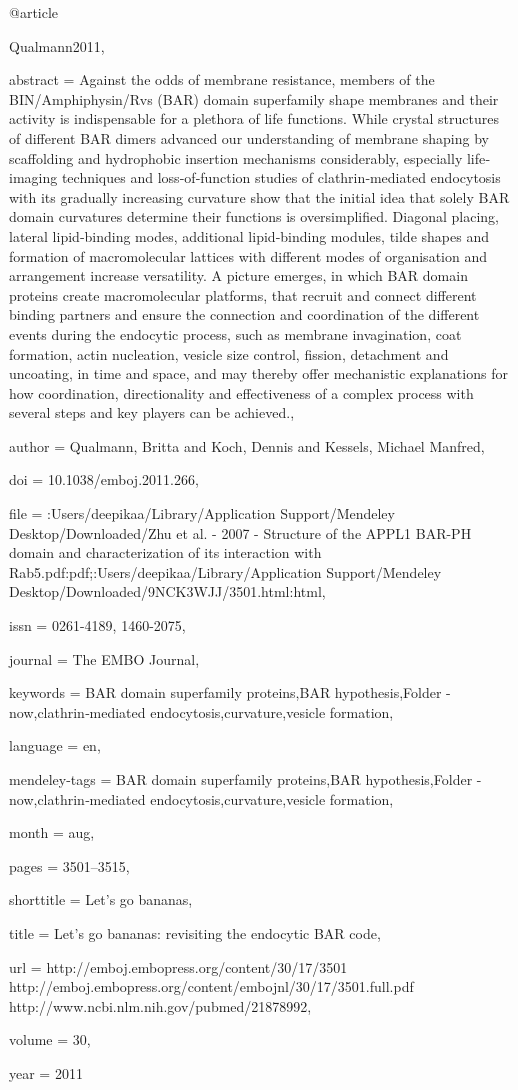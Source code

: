 @article{Qualmann2011,

abstract = {Against the odds of membrane resistance, members of the BIN/Amphiphysin/Rvs (BAR) domain superfamily shape membranes and their activity is indispensable for a plethora of life functions. While crystal structures of different BAR dimers advanced our understanding of membrane shaping by scaffolding and hydrophobic insertion mechanisms considerably, especially life‐imaging techniques and loss‐of‐function studies of clathrin‐mediated endocytosis with its gradually increasing curvature show that the initial idea that solely BAR domain curvatures determine their functions is oversimplified. Diagonal placing, lateral lipid‐binding modes, additional lipid‐binding modules, tilde shapes and formation of macromolecular lattices with different modes of organisation and arrangement increase versatility. A picture emerges, in which BAR domain proteins create macromolecular platforms, that recruit and connect different binding partners and ensure the connection and coordination of the different events during the endocytic process, such as membrane invagination, coat formation, actin nucleation, vesicle size control, fission, detachment and uncoating, in time and space, and may thereby offer mechanistic explanations for how coordination, directionality and effectiveness of a complex process with several steps and key players can be achieved.},

author = {Qualmann, Britta and Koch, Dennis and Kessels, Michael Manfred},

doi = {10.1038/emboj.2011.266},

file = {:Users/deepikaa/Library/Application Support/Mendeley Desktop/Downloaded/Zhu et al. - 2007 - Structure of the APPL1 BAR-PH domain and characterization of its interaction with Rab5.pdf:pdf;:Users/deepikaa/Library/Application Support/Mendeley Desktop/Downloaded/9NCK3WJJ/3501.html:html},

issn = {0261-4189, 1460-2075},

journal = {The EMBO Journal},

keywords = {BAR domain superfamily proteins,BAR hypothesis,Folder - now,clathrin‐mediated endocytosis,curvature,vesicle formation},

language = {en},

mendeley-tags = {BAR domain superfamily proteins,BAR hypothesis,Folder - now,clathrin‐mediated endocytosis,curvature,vesicle formation},

month = {aug},

pages = {3501--3515},

shorttitle = {Let's go bananas},

title = {{Let's go bananas: revisiting the endocytic BAR code}},

url = {http://emboj.embopress.org/content/30/17/3501 http://emboj.embopress.org/content/embojnl/30/17/3501.full.pdf http://www.ncbi.nlm.nih.gov/pubmed/21878992},

volume = {30},

year = {2011}

}

